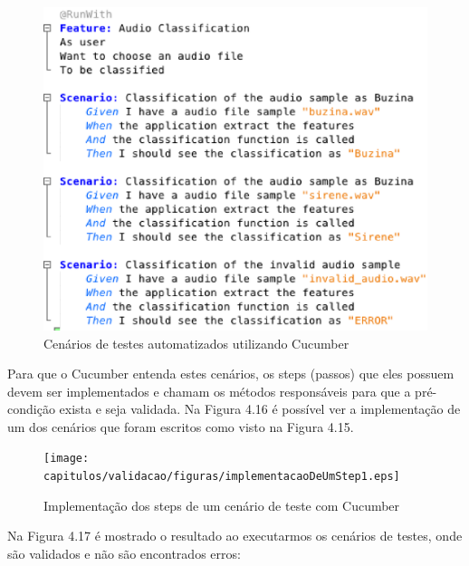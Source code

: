 \begin{figure}[H]
	\centering
	\captionsetup{justification=centering,margin=2cm}
	\includegraphics[scale=0.65]{capitulos/validacao/figuras/cenariosDoBDD.eps}
	\caption{Cenários de testes automatizados utilizando Cucumber}
	\label{fig:result-engajamento}
\end{figure}

Para que o Cucumber entenda estes cenários, os steps (passos) que eles possuem devem ser implementados e chamam os métodos responsáveis para que a pré-condição exista e seja validada. Na Figura 4.16 é possível ver a implementação de um dos cenários que foram escritos como visto na Figura 4.15.


\begin{figure}[H]
	\centering
	\captionsetup{justification=centering,margin=2cm}
	\texttt{[image: capitulos/validacao/figuras/implementacaoDeUmStep1.eps]}
	\caption{Implementação dos steps de um cenário de teste com Cucumber}
	\label{fig:result-engajamento}
\end{figure}

Na Figura 4.17 é mostrado o resultado ao executarmos os cenários de testes, onde são validados e não são encontrados erros:

